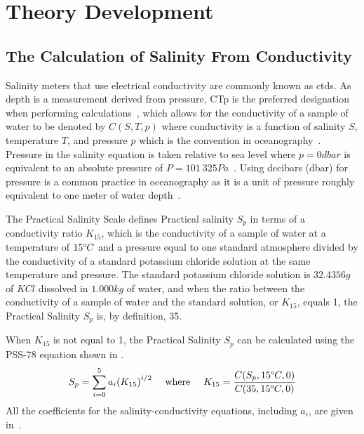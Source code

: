 
\chapter{Theory Development}\label{ch:theory-development}

\section{The Calculation of Salinity From Conductivity}\label{sec:salinity-conductivity-relationship}

Salinity meters that use electrical conductivity are commonly known as \glspl{ctd}.
As depth is a measurement derived from pressure, CTp is the preferred designation when performing calculations~\cite{lewis_salinity_definition_and_calculation_1978}, which allows for the conductivity of a sample of water to be denoted by $C(S, T, p)$ where conductivity is a function of salinity $S$, temperature $T$, and pressure $p$ which is the convention in oceanography~\cite{lewis_salinity_definition_and_calculation_1978}.
Pressure in the salinity equation is taken relative to sea level where $p = 0 dbar$ is equivalent to an absolute pressure of $P = 101\ 325 Pa$~\cite{ioc_teos_2010}.
Using decibars (dbar) for pressure is a common practice in oceanography as it is a unit of pressure roughly equivalent to one meter of water depth~\cite{seabird_dbar_to_depth_2024}.

The Practical Salinity Scale defines Practical salinity $S_p$ in terms of a conductivity ratio $K_{15}$, which is the conductivity of a sample of water at a temperature of $15\degree C$ and a pressure equal to one standard atmosphere divided by the conductivity of a standard potassium chloride solution at the same temperature and pressure.
The standard potassium chloride solution is $32.4356g$ of $KCl$ dissolved in $1.000kg$ of water, and when the ratio between the conductivity of a sample of water and the standard solution, or $K_{15}$, equals 1, the Practical Salinity $S_p$ is, by definition, 35.~\cite{ioc_teos_2010}

When $K_{15}$ is not equal to 1, the Practical Salinity $S_p$ can be calculated using the PSS-78 equation shown in .
\begin{equation}\label{eqn:pss-78-k15}
 S_p = \sum_{i=0}^{5} a_i {(K_{15})}^{i/2}~~~~\text{where}~~~~K_{15} = \frac{C(S_p, 15\degree C, 0)}{C(35, 15\degree C, 0)}
\end{equation}
All the coefficients for the salinity-conductivity equations, including $a_i$, are given in~.

